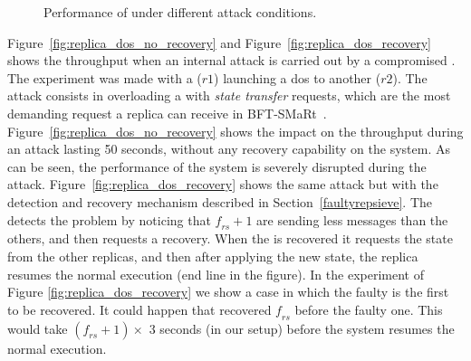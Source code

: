\begin{figure}[h]
\hspace{-5mm}
\hspace{-5mm}
\caption{\small Performance of \sieveq under different attack conditions.}
\label{fig:performance_attacks}
\end{figure}


Figure~\ref{fig:replica_dos_no_recovery} and Figure~\ref{fig:replica_dos_recovery} shows the \sieveq throughput when an internal attack is carried out by a compromised \repsieve. 
The experiment was made with a \repsieve ($r1$) launching a \gls{dos} to another \repsieve ($r2$).
The attack consists in overloading a \repsieve with \emph{state transfer} requests, which are the most demanding request a replica can receive in BFT-SMaRt~\cite{Bessani:2013}.
Figure~\ref{fig:replica_dos_no_recovery} shows the impact on the \sieveq throughput during an attack lasting 50 seconds, without any recovery capability on the system.
As can be seen, the performance of the system is severely disrupted during the attack.
Figure~\ref{fig:replica_dos_recovery} shows the same attack but with the detection and recovery mechanism described in Section~\ref{faultyrepsieve}.
The \postsieve detects the problem by noticing that $\mathit{f_{rs}+1}$ \repsieves are sending less messages than the others, and then requests a recovery.
When the \repsieve is recovered it requests the state from the other replicas, and then after applying the new state, the replica resumes the normal execution (end line in the figure).
In the experiment of Figure \ref{fig:replica_dos_recovery} we show a case in which the faulty \repsieve is the first to be recovered.
It could happen that \sieveq recovered $\mathit{f_{rs}}$ \repsieves before the faulty one.
This would take  $\mathit{(f_{rs}+1)} \times$ 3 seconds (in our setup) before the system resumes the normal execution.


